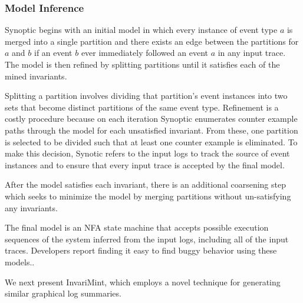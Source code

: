 \subsubsection{Model Inference}
\label{synop_inference}
Synoptic begins with an initial model in which every instance of event type
$a$ is merged into a single partition and there exists an edge between the
partitions for $a$ and $b$ if an event $b$ ever immediately
followed an event $a$ in any input trace. The model is then refined by splitting
partitions until it satisfies each of the mined invariants. 

Splitting a
partition involves dividing that partition's event instances into two sets that
become distinct partitions of the same event type.
Refinement is a costly procedure because on each iteration Synoptic enumerates counter
example paths through the model for each unsatisfied invariant. From these, one
partition is selected to be divided such that at least one counter example is eliminated.
To make this decision, Synotic refers to the input logs to track the
source of event instances and to ensure that every input trace is accepted by
the final model.

After the model satisfies each invariant, there is an additional coarsening step
which seeks to minimize the model by merging partitions without 
un-satisfying any invariants.

The final model is an NFA state machine that accepts possible execution
sequences of the system inferred from the input logs, including all of the input traces. Developers
report finding it easy to find buggy behavior using these models.\cite{BeschastnikhBSSE2011}.

We next present InvariMint, which employs a novel technique for generating
similar graphical log summaries. 

